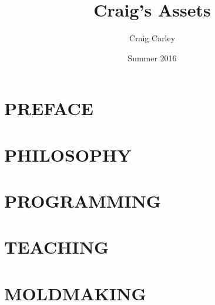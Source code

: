 \documentclass[11pt]{article}
\author{Craig Carley}
\date{Summer 2016}
\title{Craig's Assets}
\begin{document}
\maketitle
\tableofcontents


\section{PREFACE}
\label{sec-1}
\section{PHILOSOPHY}
\label{sec-2}
\section{PROGRAMMING}
\label{sec-3}
\section{TEACHING}
\label{sec-4}
\section{MOLDMAKING}
\label{sec-5}
\end{document}
